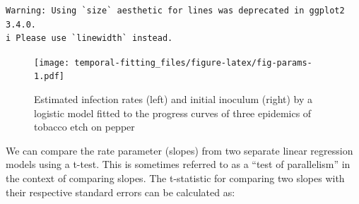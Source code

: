 \documentclass[
  letterpaper,
]{book}
\newenvironment{Shaded}{\begin{snugshade}}{\end{snugshade}}
\newcommand{\AttributeTok}[1]{\textcolor[rgb]{0.40,0.45,0.13}{#1}}
\newcommand{\DecValTok}[1]{\textcolor[rgb]{0.68,0.00,0.00}{#1}}
\newcommand{\FunctionTok}[1]{\textcolor[rgb]{0.28,0.35,0.67}{#1}}
\newcommand{\NormalTok}[1]{\textcolor[rgb]{0.00,0.23,0.31}{#1}}
\newcommand{\OtherTok}[1]{\textcolor[rgb]{0.00,0.23,0.31}{#1}}
\newcommand{\SpecialCharTok}[1]{\textcolor[rgb]{0.37,0.37,0.37}{#1}}
\newcommand{\StringTok}[1]{\textcolor[rgb]{0.13,0.47,0.30}{#1}}
\begin{document}
\begin{verbatim}
Warning: Using `size` aesthetic for lines was deprecated in ggplot2 3.4.0.
i Please use `linewidth` instead.
\end{verbatim}

\begin{Shaded}
\end{Shaded}

\begin{figure}

{\centering \texttt{[image: temporal-fitting\_files/figure-latex/fig-params-1.pdf]}

}

\caption{\label{fig-params}Estimated infection rates (left) and initial
inoculum (right) by a logistic model fitted to the progress curves of
three epidemics of tobacco etch on pepper}

\end{figure}

We can compare the rate parameter (slopes) from two separate linear
regression models using a t-test. This is sometimes referred to as a
``test of parallelism'' in the context of comparing slopes. The
t-statistic for comparing two slopes with their respective standard
errors can be calculated as:
\end{document}
